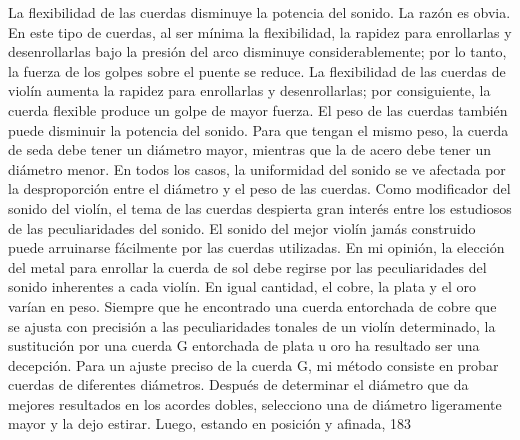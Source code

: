 La flexibilidad de las cuerdas disminuye la potencia del sonido. La razón es obvia. En este tipo de cuerdas, al ser mínima la flexibilidad, la rapidez para enrollarlas y desenrollarlas bajo la presión del arco disminuye considerablemente; por lo tanto, la fuerza de los golpes sobre el puente se reduce. La flexibilidad de las cuerdas de violín aumenta la rapidez para enrollarlas y desenrollarlas; por consiguiente, la cuerda flexible produce un golpe de mayor fuerza. El peso de las cuerdas también puede disminuir la potencia del sonido. Para que tengan el mismo peso, la cuerda de seda debe tener un diámetro mayor, mientras que la de acero debe tener un diámetro menor. En todos los casos, la uniformidad del sonido se ve afectada por la desproporción entre el diámetro y el peso de las cuerdas. Como modificador del sonido del violín, el tema de las cuerdas despierta gran interés entre los estudiosos de las peculiaridades del sonido. El sonido del mejor violín jamás construido puede arruinarse fácilmente por las cuerdas utilizadas. En mi opinión, la elección del metal para enrollar la cuerda de sol debe regirse por las peculiaridades del sonido inherentes a cada violín. En igual cantidad, el cobre, la plata y el oro varían en peso. Siempre que he encontrado una cuerda entorchada de cobre que se ajusta con precisión a las peculiaridades tonales de un violín determinado, la sustitución por una cuerda G entorchada de plata u oro ha resultado ser una decepción.
Para un ajuste preciso de la cuerda G, mi método consiste en probar cuerdas de diferentes diámetros. Después de determinar el diámetro que da mejores resultados en los acordes dobles, selecciono una de diámetro ligeramente mayor y la dejo estirar. Luego, estando en posición y afinada,
183

